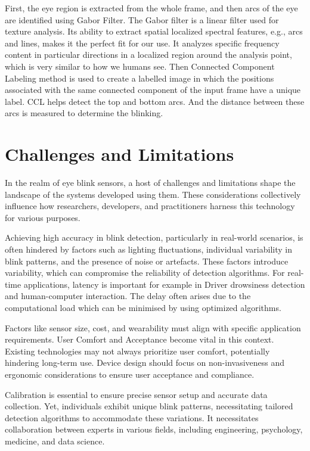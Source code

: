 \documentclass[conference]{IEEEtran}
\begin{document}
First, the eye region is extracted from the whole frame, and then arcs of the eye are identified using Gabor Filter. The Gabor filter is a linear filter used for texture analysis. Its ability to extract spatial localized spectral features, e.g., arcs and lines, makes it the perfect fit for our use. It analyzes specific frequency content in particular directions in a localized region around the analysis point, which is very similar to how we humans see.
Then Connected Component Labeling method is used to create a labelled image in which the positions associated with the same connected component of the input frame have a unique label. CCL helps detect the top and bottom arcs. And the distance between these arcs is measured to determine the blinking.


\section{Challenges and Limitations}

In the realm of eye blink sensors, a host of challenges and limitations shape the landscape of the systems developed using them. These considerations collectively influence how researchers, developers, and practitioners harness this technology for various purposes.

 Achieving high accuracy in blink detection, particularly in real-world scenarios, is often hindered by factors such as lighting fluctuations, individual variability in blink patterns, and the presence of noise or artefacts. These factors introduce variability, which can compromise the reliability of detection algorithms. For real-time applications, latency is important for example in  Driver drowsiness detection and human-computer interaction. The delay often arises due to the computational load which can be minimised by using optimized algorithms.

 Factors like sensor size, cost, and wearability must align with specific application requirements. User Comfort and Acceptance become vital in this context. Existing technologies may not always prioritize user comfort, potentially hindering long-term use. Device design should focus on non-invasiveness and ergonomic considerations to ensure user acceptance and compliance.

Calibration is essential to ensure precise sensor setup and accurate data collection. Yet, individuals exhibit unique blink patterns, necessitating tailored detection algorithms to accommodate these variations.  It necessitates collaboration between experts in various fields, including engineering, psychology, medicine, and data science. 
\end{document}
